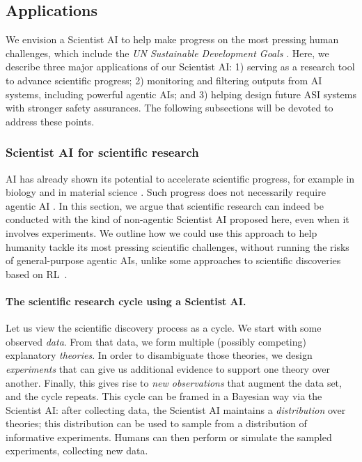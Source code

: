 \subsection{Applications}
\label{sec:plan:applications}
        
We envision a Scientist AI to help make progress on the most pressing human challenges, which include the \textit{UN Sustainable Development Goals} \cite{sdgs.un.org.2030agenda}. Here, we describe three major applications of our Scientist AI: 1) serving as a research tool to advance scientific progress; 2) monitoring and filtering outputs from AI systems, including powerful agentic AIs; and 3) helping design future ASI systems with stronger safety assurances. The following subsections will be devoted to address these points.

\subsubsection{Scientist AI for scientific research}
\label{sec:plan:application:research}    

AI has already shown its potential to accelerate scientific progress, for example in biology \cite{pmc.ncbi.nlm.nih.gov.articles.PMC10301994} and in material science \cite{onlinelibrary.wiley.com.doi.abs.10.1002.adem.202300104}. Such progress does not necessarily require agentic AI  \cite{www.nature.com.articles.s41586.021.03819.2, www.nature.com.articles.s41589.023.01349.8}. In this section, we argue that scientific research can indeed be conducted with the kind of non-agentic Scientist AI proposed here, even when it involves experiments. We outline how we could use this approach to help humanity tackle its most pressing scientific challenges, without running the risks of general-purpose agentic AIs, unlike some approaches to scientific discoveries based on RL~\cite{popova2018deep}.

\paragraph{The scientific research cycle using a Scientist AI.} Let us view the scientific discovery process as a cycle. We start with some observed \emph{data}. From that data, we form multiple (possibly competing) explanatory \emph{theories}. In order to disambiguate those theories, we design \emph{experiments} that can give us additional evidence to support one theory over another. Finally, this gives rise to \emph{new observations} that augment the data set, and the cycle repeats.
This cycle can be framed in a Bayesian way via the Scientist AI: after collecting data, the Scientist AI maintains a \emph{distribution} over theories; this distribution can be used to sample from a distribution of informative experiments. Humans can then perform or simulate the sampled experiments, collecting new data.


